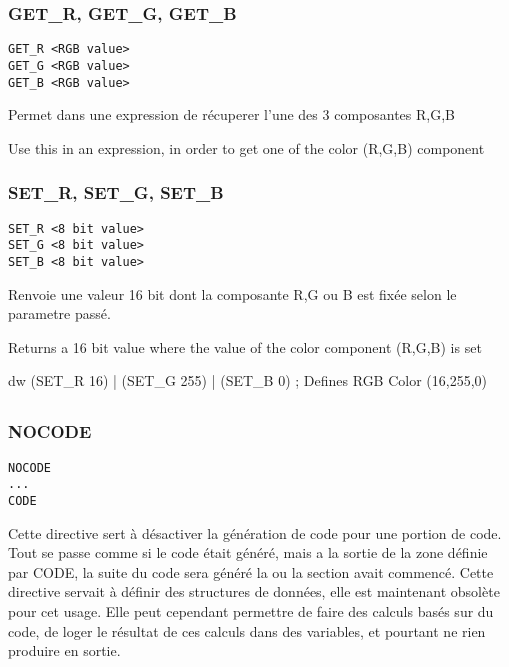 \subsubsection{GET\_R, GET\_G, GET\_B}

\begin{verbatim}
GET_R <RGB value>
GET_G <RGB value>
GET_B <RGB value>
\end{verbatim}

\begin{xfr}
Permet dans une expression de récuperer l'une des 3 composantes R,G,B
\end{xfr}

\begin{xen}
Use this in an expression, in order to get one of the color (R,G,B) component
\end{xen}

\subsubsection{SET\_R, SET\_G, SET\_B}
\begin{verbatim}
SET_R <8 bit value>
SET_G <8 bit value>
SET_B <8 bit value>
\end{verbatim}

\begin{xfr}
Renvoie une valeur 16 bit dont la composante R,G ou B est fixée selon le parametre passé.
\end{xfr}

\begin{xen}
Returns a 16 bit value where the value of the color component (R,G,B) is set 
\end{xen}

\begin{code}
dw (SET\_R 16) | (SET\_G 255) | (SET\_B 0) ; Defines RGB Color (16,255,0)
\end{code}


\subsection{}

\subsubsection{NOCODE}
\begin{verbatim}
NOCODE
...
CODE
\end{verbatim}

\begin{xfr}
  Cette directive sert à désactiver la génération de code pour une portion de code. Tout se passe comme si le code était généré, mais a la sortie de la zone définie par CODE, la suite du code sera généré la ou la section avait commencé.
  Cette directive servait à définir des structures de données, elle est maintenant obsolète pour cet usage. Elle peut cependant permettre de faire des calculs basés sur du code, de loger le résultat de ces calculs dans des variables, et pourtant ne rien produire en sortie.
\end{xfr}

